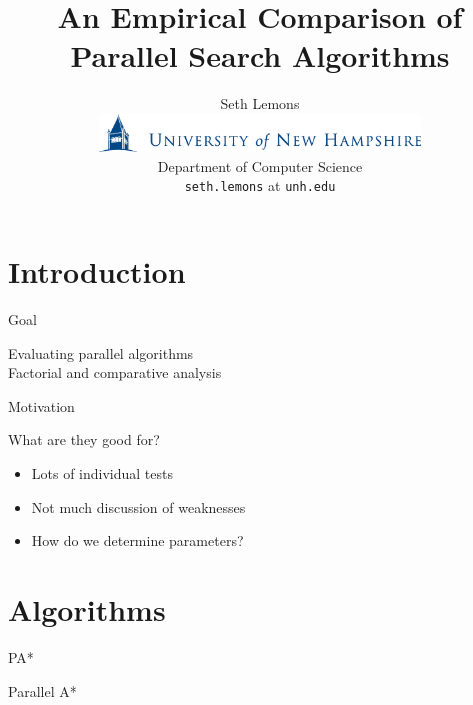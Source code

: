 \documentclass[style=unh]{powerdot}
\title{An Empirical Comparison of Parallel Search Algorithms}
\author{Seth Lemons \vspace{0.2in} \\
  \includegraphics[height=0.4in]{figures/unh-logo-words.eps} \\
  Department of Computer Science \\
  {\tt seth.lemons} at {\tt unh.edu}}
\date{\mbox{}}
\begin{document}
\maketitle


\section[slide=false]{Introduction}


\begin{slide}{Goal}
  \vspace{1in}
  \begin{center}
    Evaluating parallel algorithms \\
    {\tiny Factorial and comparative analysis}
  \end{center}

\end{slide}


\begin{slide}{Motivation}
    \begin{center}
      What are they good for?
    \end{center}

    \begin{itemize}
    \item Lots of individual tests
    \item Not much discussion of weaknesses
    \item How do we determine parameters?
    \end{itemize}
\end{slide}


\section{Algorithms}


\begin{slide}{PA*}
  \vspace{.2in}
  \begin{center}
    Parallel A*
  \end{center}

  \vspace{.1in}

\end{slide}
\end{document}
